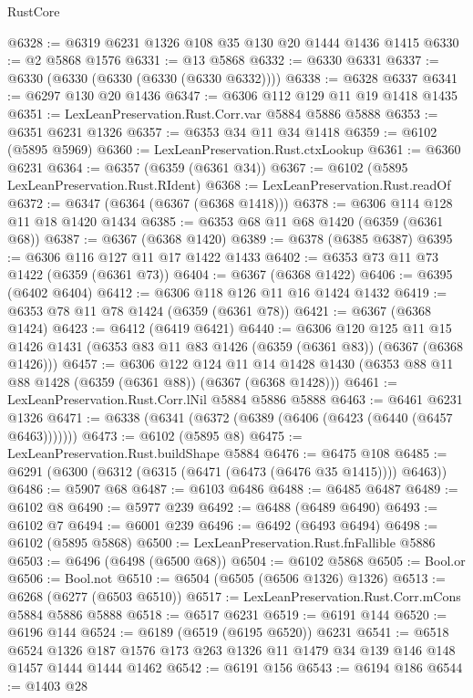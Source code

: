 \begin{lexlean}{RustCore}
\begin{coremodule}
@6328 := @6319 @6231 @1326 @108 @35 @130 @20 @1444 @1436 @1415
@6330 := @2 @5868 @1576
@6331 := @13 @5868
@6332 := @6330 @6331
@6337 := @6330 (@6330 (@6330 (@6330 (@6330 @6332))))
@6338 := @6328 @6337
@6341 := @6297 @130 @20 @1436
@6347 := @6306 @112 @129 @11 @19 @1418 @1435
@6351 := LexLeanPreservation.Rust.Corr.var @5884 @5886 @5888
@6353 := @6351 @6231 @1326
@6357 := @6353 @34 @11 @34 @1418
@6359 := @6102 (@5895 @5969)
@6360 := LexLeanPreservation.Rust.ctxLookup
@6361 := @6360 @6231
@6364 := @6357 (@6359 (@6361 @34))
@6367 := @6102 (@5895 LexLeanPreservation.Rust.RIdent)
@6368 := LexLeanPreservation.Rust.readOf
@6372 := @6347 (@6364 (@6367 (@6368 @1418)))
@6378 := @6306 @114 @128 @11 @18 @1420 @1434
@6385 := @6353 @68 @11 @68 @1420 (@6359 (@6361 @68))
@6387 := @6367 (@6368 @1420)
@6389 := @6378 (@6385 @6387)
@6395 := @6306 @116 @127 @11 @17 @1422 @1433
@6402 := @6353 @73 @11 @73 @1422 (@6359 (@6361 @73))
@6404 := @6367 (@6368 @1422)
@6406 := @6395 (@6402 @6404)
@6412 := @6306 @118 @126 @11 @16 @1424 @1432
@6419 := @6353 @78 @11 @78 @1424 (@6359 (@6361 @78))
@6421 := @6367 (@6368 @1424)
@6423 := @6412 (@6419 @6421)
@6440 := @6306
    @120
    @125
    @11
    @15
    @1426
    @1431
    (@6353 @83 @11 @83 @1426 (@6359 (@6361 @83)) (@6367 (@6368 @1426)))
@6457 := @6306
    @122
    @124
    @11
    @14
    @1428
    @1430
    (@6353 @88 @11 @88 @1428 (@6359 (@6361 @88)) (@6367 (@6368 @1428)))
@6461 := LexLeanPreservation.Rust.Corr.lNil @5884 @5886 @5888
@6463 := @6461 @6231 @1326
@6471 := @6338 (@6341 (@6372 (@6389 (@6406 (@6423 (@6440 (@6457 @6463)))))))
@6473 := @6102 (@5895 @8)
@6475 := LexLeanPreservation.Rust.buildShape @5884
@6476 := @6475 @108
@6485 := @6291 (@6300 (@6312 (@6315 (@6471 (@6473 (@6476 @35 @1415)))) @6463))
@6486 := @5907 @68
@6487 := @6103 @6486
@6488 := @6485 @6487
@6489 := @6102 @8
@6490 := @5977 @239
@6492 := @6488 (@6489 @6490)
@6493 := @6102 @7
@6494 := @6001 @239
@6496 := @6492 (@6493 @6494)
@6498 := @6102 (@5895 @5868)
@6500 := LexLeanPreservation.Rust.fnFallible @5886
@6503 := @6496 (@6498 (@6500 @68))
@6504 := @6102 @5868
@6505 := Bool.or
@6506 := Bool.not
@6510 := @6504 (@6505 (@6506 @1326) @1326)
@6513 := @6268 (@6277 (@6503 @6510))
@6517 := LexLeanPreservation.Rust.Corr.mCons @5884 @5886 @5888
@6518 := @6517 @6231
@6519 := @6191 @144
@6520 := @6196 @144
@6524 := @6189 (@6519 (@6195 @6520)) @6231
@6541 := @6518
    @6524
    @1326
    @187
    @1576
    @173
    @263
    @1326
    @11
    @1479
    @34
    @139
    @146
    @148
    @1457
    @1444
    @1444
    @1462
@6542 := @6191 @156
@6543 := @6194 @186
@6544 := @1403 @28

\end{coremodule}
\end{lexlean}
